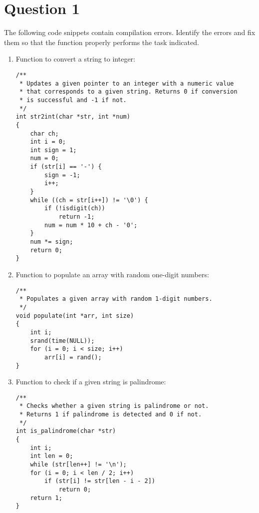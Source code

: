 
\section*{Question 1}

The following code snippets contain compilation errors.
Identify the errors and fix them so that the function properly performs the task indicated.

\begin{enumerate}[label=\textbf{(\alph*)}]

\item Function to convert a string to integer:
\begin{lstlisting}
/**
 * Updates a given pointer to an integer with a numeric value
 * that corresponds to a given string. Returns 0 if conversion
 * is successful and -1 if not.
 */
int str2int(char *str, int *num)
{
	char ch;
	int i = 0;
	int sign = 1;
	num = 0;
	if (str[i] == '-') {
		sign = -1;
		i++;
	}
	while ((ch = str[i++]) != '\0') {
		if (!isdigit(ch))
			return -1;
		num = num * 10 + ch - '0';
	}
	num *= sign;
	return 0;
}
\end{lstlisting}

\item Function to populate an array with random one-digit numbers:
\begin{lstlisting}
/**
 * Populates a given array with random 1-digit numbers.
 */
void populate(int *arr, int size)
{
	int i;
	srand(time(NULL));
	for (i = 0; i < size; i++)
		arr[i] = rand();
}
\end{lstlisting}

\item Function to check if a given string is palindrome:
\begin{lstlisting}
/**
 * Checks whether a given string is palindrome or not.
 * Returns 1 if palindrome is detected and 0 if not.
 */
int is_palindrome(char *str)
{
	int i;
	int len = 0;
	while (str[len++] != '\n');
	for (i = 0; i < len / 2; i++)
		if (str[i] != str[len - i - 2])
			return 0;
	return 1;
}
\end{lstlisting}

\end{enumerate}
